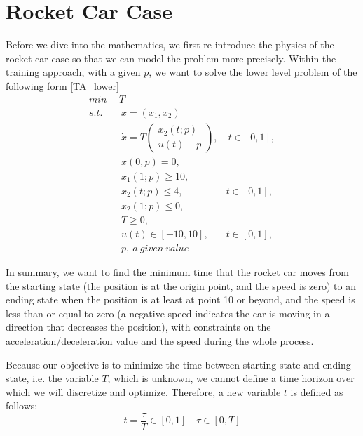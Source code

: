 \chapter{Rocket Car Case}
Before we dive into the mathematics, we first re-introduce the physics of the rocket car case so that we can model the problem more precisely. Within the training approach, with a given $p$, we want to solve the lower level problem of the following form \ref{TA_lower}
\begin{subequations}
	\begin{align}
    	\underset{}{min} \   & \  T \\ 
		s.t.  & \ \ x = (x_1, x_2)   \label{ta_rc_x} \\ 
		& \ \  \dot{x} = T  \begin{pmatrix}  x_2(t;p) \\ u(t)-p   \end{pmatrix}, & \ t \in [0,1],  \label{ta_rc_partial2} \\
		& \ \ x(0,p) = 0, \label{ta_rc_t2}\\
		& \ \ x_1(1;p) \geq 10, \label{ta_rc_x1_t2} \\
		& \ \ x_2(t;p) \leq 4, & t \in [0,1], \label{ta_rc_x2_tc2} \\
		& \ \ x_2(1;p) \leq 0, \label{ta_rc_x2_t1_2}  \\
		& \ \ T \geq 0, \\
		& \ \ u(t) \in [-10, 10], & t \in [0,1], \\
		& \ \ p, \   a \ given \ value
	\end{align}
	\label{TA_lower2}
\end{subequations}

In summary, we want to find the minimum time that the rocket car moves from the starting state (the position is at the origin point, and the speed is zero) to an ending state when the position is at least at point 10 or beyond, and the speed is less than or equal to zero (a negative speed indicates the car is moving in a direction that decreases the position), with constraints on the acceleration/deceleration value and the speed during the whole process. 

Because our objective is to minimize the time between starting state and ending state, i.e. the variable $T$, which is unknown, we cannot define a time horizon over which we will discretize and optimize. Therefore, a new variable $t$ is defined as follows: 
\begin{equation*}
 	t= \frac{\tau}{T} \in [0,1] \quad \tau \in [0, T]
 	\label{eqn:timet}
\end{equation*}


